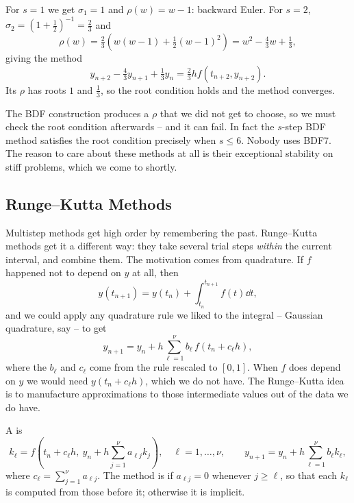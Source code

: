 \begin{example}
  For $s = 1$ we get $\sigma_1 = 1$ and $\rho(w) = w-1$: backward Euler. For $s = 2$, $\sigma_2 = (1 + \tfrac12)^{-1} = \tfrac23$ and
  $$
  \rho(w) = \tfrac23\left(w(w-1) + \tfrac12(w-1)^2\right) = w^2 - \tfrac43 w + \tfrac13,
  $$
  giving the method
  $$
  y_{n+2} - \tfrac43 y_{n+1} + \tfrac13 y_n = \tfrac23 h f(t_{n+2}, y_{n+2}).
  $$
  Its $\rho$ has roots $1$ and $\tfrac13$, so the root condition holds and the method converges.
\end{example}

\begin{remark}
  The BDF construction produces a $\rho$ that we did not get to choose, so we must check the root condition afterwards -- and it can fail. In fact the $s$-step BDF method satisfies the root condition precisely when $s \leq 6$. Nobody uses BDF7. The reason to care about these methods at all is their exceptional stability on stiff problems, which we come to shortly.
\end{remark}

\subsection{Runge--Kutta Methods}

Multistep methods get high order by remembering the past. Runge--Kutta methods get it a different way: they take several trial steps \emph{within} the current interval, and combine them. The motivation comes from quadrature. If $f$ happened not to depend on $y$ at all, then
$$
y(t_{n+1}) = y(t_n) + \int_{t_n}^{t_{n+1}}f(t)\dd t,
$$
and we could apply any quadrature rule we liked to the integral -- Gaussian quadrature, say -- to get
$$
y_{n+1} = y_n + h\sum_{\ell=1}^{\nu}b_\ell\, f(t_n + c_\ell h),
$$
where the $b_\ell$ and $c_\ell$ come from the rule rescaled to $[0,1]$. When $f$ does depend on $y$ we would need $y(t_n + c_\ell h)$, which we do not have. The Runge--Kutta idea is to manufacture approximations to those intermediate values out of the data we do have.

\begin{definition}
  A  is
  $$
  k_\ell = f\left(t_n + c_\ell h,\ y_n + h\sum_{j=1}^{\nu}a_{\ell j}k_j\right), \quad \ell = 1, \dots, \nu, \qquad y_{n+1} = y_n + h\sum_{\ell=1}^{\nu}b_\ell k_\ell,
  $$
  where $c_\ell = \sum_{j=1}^\nu a_{\ell j}$. The method is  if $a_{\ell j} = 0$ whenever $j \geq \ell$, so that each $k_\ell$ is computed from those before it; otherwise it is implicit.
\end{definition}

